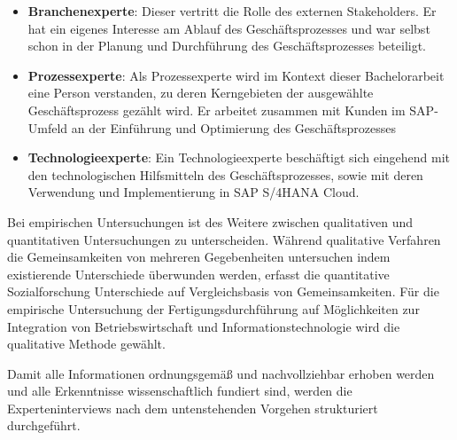 \begin{itemize}
    \item 
    \textbf{Branchenexperte}: Dieser vertritt die Rolle des externen Stakeholders. Er hat ein eigenes Interesse am Ablauf des Geschäftsprozesses und war selbst schon in der Planung und Durchführung des Geschäftsprozesses beteiligt. 
    \item
    \textbf{Prozessexperte}: Als Prozessexperte wird im Kontext dieser Bachelorarbeit eine Person verstanden, zu deren Kerngebieten der ausgewählte Geschäftsprozess gezählt wird. Er arbeitet zusammen mit Kunden im SAP-Umfeld an der Einführung und Optimierung des Geschäftsprozesses
    \item
    \textbf{Technologieexperte}:  Ein Technologieexperte beschäftigt sich eingehend mit den technologischen Hilfsmitteln des Geschäftsprozesses, sowie mit deren Verwendung und Implementierung in SAP S/4HANA Cloud.
\end{itemize}

Bei empirischen Untersuchungen ist des Weitere  zwischen qualitativen und quantitativen Untersuchungen zu unterscheiden. Während qualitative Verfahren die Gemeinsamkeiten von mehreren Gegebenheiten untersuchen indem existierende Unterschiede überwunden werden, erfasst die quantitative Sozialforschung Unterschiede auf Vergleichsbasis von Gemeinsamkeiten. Für die empirische Untersuchung der Fertigungsdurchführung auf Möglichkeiten zur Integration von Betriebswirtschaft und Informationstechnologie wird die qualitative Methode gewählt. 

Damit alle Informationen ordnungsgemäß und nachvollziehbar erhoben werden und alle Erkenntnisse wissenschaftlich fundiert sind, werden die Experteninterviews nach dem untenstehenden Vorgehen strukturiert durchgeführt.


